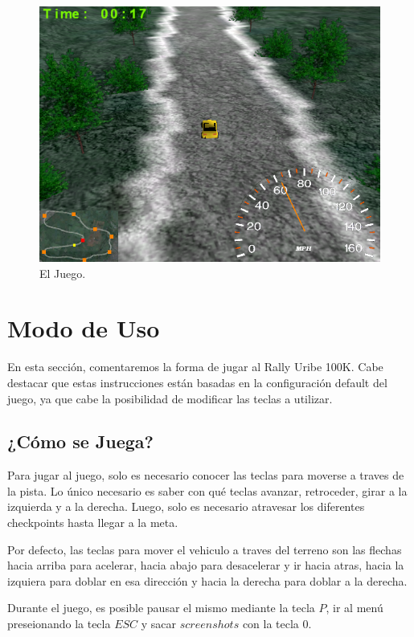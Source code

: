 \documentclass[a4paper,10pt]{article}
\begin{document}
\begin{figure}
 \centering
 \includegraphics[bb=0 0 640 480,scale=0.4,keepaspectratio=true]{./game.png}
 \caption{El Juego.}
 \label{fig:game}
\end{figure}


\section{Modo de Uso}
\label{mododeuso}
En esta secci\'on, comentaremos la forma de jugar al Rally Uribe 100K.  Cabe
destacar que estas instrucciones est\'an basadas en la configuraci\'on default
del
juego, ya que cabe la posibilidad de modificar las teclas a utilizar.

\subsection{¿C\'omo se Juega?}
Para jugar al juego, solo es necesario conocer las teclas para moverse a traves
de la pista.  Lo \'unico necesario es saber con qu\'e teclas avanzar,
retroceder,
girar a la izquierda y a la derecha.  Luego, solo es necesario atravesar los
diferentes checkpoints hasta llegar a la meta.

Por defecto, las teclas para mover el vehiculo a traves del terreno son las
flechas hacia arriba para acelerar, hacia abajo para desacelerar y ir hacia
atras, hacia la izquiera para doblar en esa direcci\'on y hacia la derecha para
doblar a la derecha.

Durante el juego, es posible pausar el mismo mediante la tecla $P$, ir al
men\'u preseionando la tecla $ESC$ y sacar
$screenshots$ con la tecla $0$.
\end{document}

